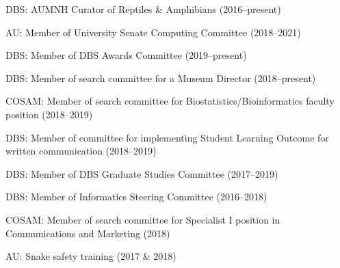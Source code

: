 \begin{veryTightItemize}
    \item DBS: AUMNH Curator of Reptiles \& Amphibians (2016--present)
    \item AU: Member of University Senate Computing Committee (2018--2021)
    \item DBS: Member of DBS Awards Committee (2019--present)
    \item DBS: Member of search committee for a Museum Director (2018--present)
    \item COSAM: Member of search committee for Biostatistics/Bioinformatics
        faculty position (2018--2019)
    \item DBS: Member of committee for implementing Student Learning Outcome
        for written communication (2018--2019)
    \item DBS: Member of DBS Graduate Studies Committee (2017--2019)
    \item DBS: Member of Informatics Steering Committee (2016--2018)
    \item COSAM: Member of search committee for Specialist I position in
        Communications and Marketing (2018)
    \item AU: Snake safety training (2017 \& 2018)
\end{veryTightItemize}
